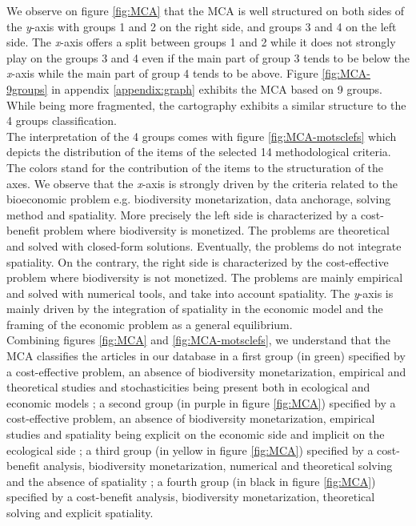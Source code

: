 %
We observe on figure \ref{fig:MCA} that the MCA is well structured on both sides of the \textit{y}-axis with groups 1 and 2 on the right side, and groups 3 and 4 on the left side. The \textit{x}-axis offers a split between groups 1 and 2 while it does not strongly play on the groups 3 and 4 even if the main part of group 3 tends to be below the \textit{x}-axis while the main part of group 4 tends to be above. Figure \ref{fig:MCA-9groups} in appendix \ref{appendix:graph} exhibits the MCA based on 9 groups. While being more fragmented, the cartography exhibits a similar structure to the 4 groups classification. 
\\
\hspace*{1.5em} The interpretation of the 4 groups comes with figure \ref{fig:MCA-motsclefs} which depicts the distribution of the items of the selected 14 methodological criteria. The colors stand for the contribution of the items to the structuration of the axes. We observe that the \textit{x}-axis is strongly driven by the criteria related to the bioeconomic problem e.g. biodiversity monetarization, data anchorage, solving method and spatiality. More precisely the left side is characterized by a cost-benefit problem where biodiversity is monetized. The problems are theoretical and solved with closed-form solutions. Eventually, the problems do not integrate spatiality. On the contrary, the right side is characterized by the cost-effective problem where biodiversity is not monetized. The problems are mainly empirical and solved with numerical tools, and take into account spatiality. The \textit{y}-axis is mainly driven by the integration of spatiality in the economic model and the framing of the economic problem as a general equilibrium. 
\\
\hspace*{1.5em} Combining figures \ref{fig:MCA}  and \ref{fig:MCA-motsclefs}, we understand that the MCA classifies the articles in our database in a first group (in green) specified by a cost-effective problem, an absence of biodiversity monetarization, empirical and theoretical studies and stochasticities being present both in ecological and economic models ;  a second group (in purple in figure \ref{fig:MCA}) specified by a cost-effective problem, an absence of biodiversity monetarization, empirical studies and spatiality being explicit on the economic side and implicit on the ecological side ; a third group (in yellow in figure \ref{fig:MCA}) specified by a cost-benefit analysis, biodiversity monetarization, numerical and theoretical solving and the absence of spatiality ; a fourth group (in black in figure \ref{fig:MCA}) specified by a cost-benefit analysis, biodiversity monetarization, theoretical solving and explicit spatiality.


